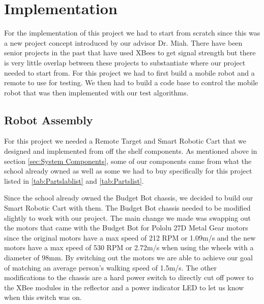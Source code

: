 \chapter{Implementation}
\label{ch: implementation}

For the implementation of this project we had to start from scratch since this was a new project concept introduced by our advisor Dr. Miah. There have been senior projects in the past that have used XBees to get signal strength but there is very little overlap between these projects to substantiate where our project needed to start from. For this project we had to first build a mobile robot and a remote to use for testing. We then had to build a code base to control the mobile robot that was then implemented with our test algorithms.

\section{Robot Assembly}
\label{sec:Robot Assembly}

For this project we needed a Remote Target and Smart Robotic Cart that we designed and implemented from off the shelf components.  As mentioned above in section \ref{sec:System Components}, some of our components came from what the school already owned as well as some we had to buy specifically for this project listed in \autoref{tab:Partslablist} and \autoref{tab:Partslist}.

\vspace*{12pt}
\noindent
Since the school already owned the Budget Bot chassis, we decided to build our Smart Robotic Cart with them. The Budget Bot chassis needed to be modified slightly to work with our project. The main change we made was swapping out the motors that came with the Budget Bot for Pololu 27D Metal Gear motors since the original motors have a max speed of 212 RPM or 1.09m/s and the new motors have a max speed of 530 RPM or 2.72m/s when using the wheels with a diameter of 98mm. By switching out the motors we are able to achieve our goal of matching an average person's walking speed of 1.5m/s. The other modifications to the chassis are a hard power switch to directly cut off power to the XBee modules in the reflector and a power indicator LED to let us know when this switch was on.


